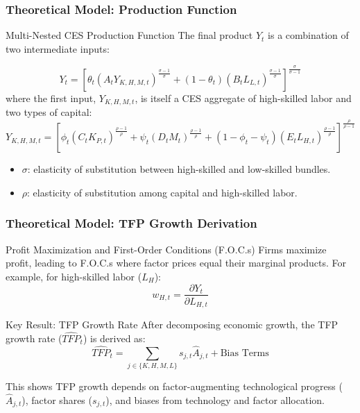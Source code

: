 \documentclass[aspectratio=169]{beamer}
\begin{document}
\begin{frame}
  \frametitle{Theoretical Model: Production Function}
  \begin{block}{Multi-Nested CES Production Function}
  The final product $Y_t$ is a combination of two intermediate inputs:
  \end{block}
  \begin{equation}
    Y_{t} = \left[ \theta_{t} (A_{t} Y_{K,H,M,t})^{\frac{\sigma-1}{\sigma}} + (1-\theta_{t}) (B_{t} L_{L,t})^{\frac{\sigma-1}{\sigma}} \right]^{\frac{\sigma}{\sigma-1}} \label{eq:main_prod_full}
  \end{equation}
  where the first input, $Y_{K,H,M,t}$, is itself a CES aggregate of high-skilled labor and two types of capital:
  \begin{equation}
    Y_{K,H,M,t} = \left[ \phi_t (C_t K_{P,t})^{\frac{\rho-1}{\rho}} + \psi_t (D_t M_t)^{\frac{\rho-1}{\rho}} + (1-\phi_t-\psi_t)(E_t L_{H,t})^{\frac{\rho-1}{\rho}} \right]^{\frac{\rho}{\rho-1}}
  \end{equation}
  \begin{itemize}
    \item $\sigma$: elasticity of substitution between high-skilled and low-skilled bundles.
    \item $\rho$: elasticity of substitution among capital and high-skilled labor.
  \end{itemize}
\end{frame}

\begin{frame}
  \frametitle{Theoretical Model: TFP Growth Derivation}
  \begin{block}{Profit Maximization and First-Order Conditions (F.O.C.s)}
    Firms maximize profit, leading to F.O.C.s where factor prices equal their marginal products. For example, for high-skilled labor ($L_H$):
    \begin{equation*}
       w_{H,t} = \frac{\partial Y_t}{\partial L_{H,t}}
    \end{equation*}
  \end{block}
  
  \begin{alertblock}{Key Result: TFP Growth Rate}
  After decomposing economic growth, the TFP growth rate ($\widehat{TFP}_t$) is derived as:
    \begin{equation}
        \widehat{TFP}_{t} = \sum_{j \in \{K,H,M,L\}} s_{j,t} \widehat{A}_{j,t} + \text{Bias Terms}
    \end{equation}
  \end{alertblock}
  This shows TFP growth depends on factor-augmenting technological progress ($\widehat{A}_{j,t}$), factor shares ($s_{j,t}$), and biases from technology and factor allocation.
\end{frame}
\end{document}
